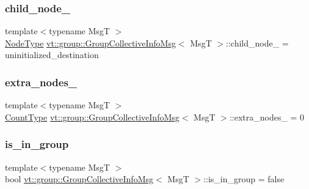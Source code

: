 \subsubsection{\texorpdfstring{child\+\_\+node\+\_\+}{child\_node\_}}
{\footnotesize\ttfamily template$<$typename MsgT $>$ \\
\hyperlink{namespacevt_a866da9d0efc19c0a1ce79e9e492f47e2}{Node\+Type} \hyperlink{structvt_1_1group_1_1_group_collective_info_msg}{vt\+::group\+::\+Group\+Collective\+Info\+Msg}$<$ MsgT $>$\+::child\+\_\+node\+\_\+ = uninitialized\+\_\+destination\hspace{0.3cm}{\ttfamily [private]}}

\mbox{\label{structvt_1_1group_1_1_group_collective_info_msg_af8421eb6d18618341f60e76ee0bb9cee}} 
\subsubsection{\texorpdfstring{extra\+\_\+nodes\+\_\+}{extra\_nodes\_}}
{\footnotesize\ttfamily template$<$typename MsgT $>$ \\
\hyperlink{structvt_1_1group_1_1_group_collective_info_msg_a3d20316314d3cc3ac13ff4c5250203a5}{Count\+Type} \hyperlink{structvt_1_1group_1_1_group_collective_info_msg}{vt\+::group\+::\+Group\+Collective\+Info\+Msg}$<$ MsgT $>$\+::extra\+\_\+nodes\+\_\+ = 0\hspace{0.3cm}{\ttfamily [private]}}

\mbox{\label{structvt_1_1group_1_1_group_collective_info_msg_aaab4ffad3e4bb20c80f6a7abbb1934ea}} 
\subsubsection{\texorpdfstring{is\+\_\+in\+\_\+group}{is\_in\_group}}
{\footnotesize\ttfamily template$<$typename MsgT $>$ \\
bool \hyperlink{structvt_1_1group_1_1_group_collective_info_msg}{vt\+::group\+::\+Group\+Collective\+Info\+Msg}$<$ MsgT $>$\+::is\+\_\+in\+\_\+group = false\hspace{0.3cm}{\ttfamily [private]}}

